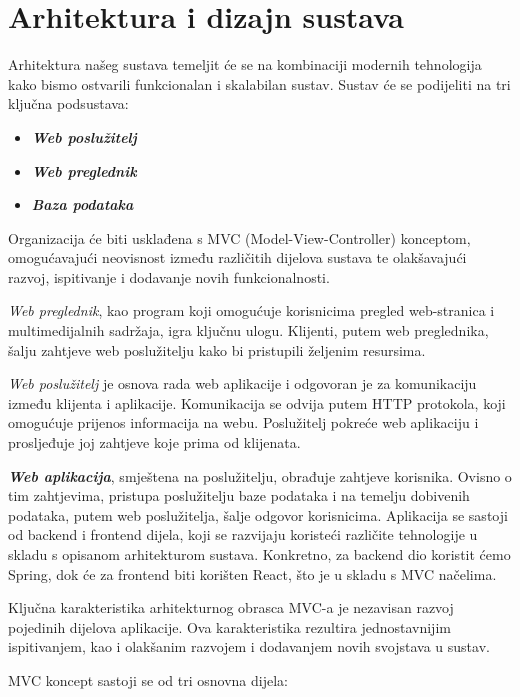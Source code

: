 \chapter{Arhitektura i dizajn sustava}
		
	
	Arhitektura našeg sustava temeljit će se na kombinaciji modernih tehnologija kako bismo ostvarili funkcionalan i skalabilan sustav. Sustav će se podijeliti na tri ključna podsustava: 
	\begin{itemize}
		\item 	\textit{\textbf{Web poslužitelj}}		
		\item 	\textit{\textbf{Web preglednik}}	
		\item 	\textit{\textbf{Baza podataka}}
	\end{itemize}
	Organizacija će biti usklađena s MVC (Model-View-Controller) konceptom, omogućavajući neovisnost između različitih dijelova sustava te olakšavajući razvoj, ispitivanje i dodavanje novih funkcionalnosti.
	
	\textit{Web preglednik}, kao program koji omogućuje korisnicima pregled web-stranica i multimedijalnih sadržaja, igra ključnu ulogu. Klijenti, putem web preglednika, šalju zahtjeve web poslužitelju kako bi pristupili željenim resursima.
	
	\textit{Web poslužitelj} je osnova rada web aplikacije i odgovoran je za komunikaciju između klijenta i aplikacije. Komunikacija se odvija putem HTTP protokola, koji omogućuje prijenos informacija na webu. Poslužitelj pokreće web aplikaciju i prosljeđuje joj zahtjeve koje prima od klijenata.	

	\textit{\textbf{Web aplikacija}}, smještena na poslužitelju, obrađuje zahtjeve korisnika. Ovisno o tim zahtjevima, pristupa poslužitelju baze podataka i na temelju dobivenih podataka, putem web poslužitelja, šalje odgovor korisnicima. Aplikacija se sastoji od backend i frontend dijela, koji se razvijaju koristeći različite tehnologije u skladu s opisanom arhitekturom sustava. Konkretno, za backend dio koristit ćemo Spring, dok će za frontend biti korišten React, što je u skladu s MVC načelima.
		
	Ključna karakteristika arhitekturnog obrasca MVC-a je nezavisan razvoj pojedinih dijelova aplikacije. Ova karakteristika rezultira jednostavnijim ispitivanjem, kao i olakšanim razvojem i dodavanjem novih svojstava u sustav.
	
	MVC koncept sastoji se od tri osnovna dijela:
	
